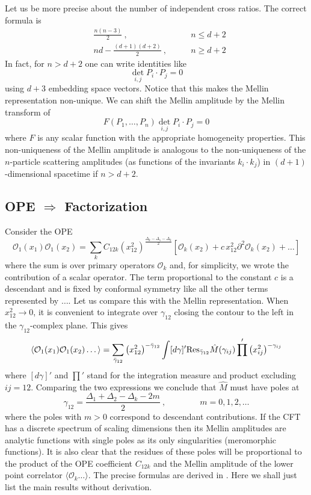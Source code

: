 \documentclass{ws-rv9x6}
\newcommand\be{\begin{equation}}
\newcommand\ee{\end{equation}}
\begin{document}
Let us be more precise about the number of independent cross ratios.
The correct formula is
\begin{align}
&\frac{n(n-3)}{2}\ ,\qquad &n\le d+2 \\
& n d  - \frac{(d+1)(d+2)}{2}\ ,\qquad  &n\ge d+2 
\end{align}
In fact, for $n> d+2$ one can write identities like
\be
\det_{i,j} P_i \cdot P_j = 0
\ee
using $d+3$ embedding space vectors.
Notice that this makes the Mellin representation non-unique.
We can shift the Mellin amplitude by the Mellin transform of 
\be
F(P_1, \dots, P_n)  \det_{i,j} P_i \cdot P_j =0
\ee
where $F$ is any scalar function with the appropriate homogeneity properties.
This non-uniqueness of the Mellin amplitude is analogous to the non-uniqueness of the $n$-particle scattering amplitudes (as functions of the invariants $k_i\cdot k_j$) in $(d+1)$-dimensional spacetime if $n>d+2$.



\subsection{OPE $\Rightarrow$ Factorization} 
Consider the OPE
\be
\mathcal{O}_1(x_1) \mathcal{O}_1(x_2) =
\sum_k C_{12k} \left(x_{12}^2 \right)^{\frac{\Delta_k-\Delta_1-\Delta_2}{2}}
\left[
\mathcal{O}_k(x_2)+
c\, x_{12}^2 \partial^2 \mathcal{O}_k(x_2)
+\dots
\right] 
\ee
where the sum is over primary operators $\mathcal{O}_k$ and, for simplicity, we wrote the contribution of a scalar operator. The term proportional to the constant $c$ is a descendant and is fixed by conformal symmetry like all the other terms represented by $\dots$.
Let us compare this with the Mellin representation. 
When $x_{12}^2  \to 0$, it is convenient to integrate over $\gamma_{12}$ closing the contour to the left in the $\gamma_{12}$-complex plane. This gives
\be
\langle 
\mathcal{O}_1(x_1) \mathcal{O}_1(x_2) \dots \rangle
= \sum_{\bar{\gamma}_{12}} \left( x_{12}^2  \right)^{-\bar{\gamma}_{12}}
\int [d\gamma]' {\rm Res}_{\bar{\gamma}_{12}} \hat{M}(\gamma_{ij})
\prod' \left(x_{ij}^2 \right)^{-\gamma_{ij}}
\ee
where $[d\gamma]'$ and $\prod'$ stand for the integration measure and product excluding $ij=12$.
Comparing the two expressions we conclude that $\hat{M}$ must have poles at 
\be
\gamma_{12}=\frac{\Delta_1+\Delta_2-\Delta_k-2m}{2}\ ,\qquad  \qquad
m=0,1,2,\dots
\ee
where the poles with $m>0$ correspond to descendant contributions.
If the CFT has a discrete spectrum of scaling dimensions then its Mellin amplitudes are analytic functions with single poles as its only singularities (meromorphic functions).
It is also clear that the residues of these poles will be proportional to the product of the OPE coefficient $C_{12k}$ and the Mellin amplitude of the lower point correlator $\langle \mathcal{O}_k \dots \rangle$.
The precise formulas are derived in \cite{Mack:2009mi, Goncalves:2014rfa}. Here we shall just list the main results without derivation.
\end{document}
